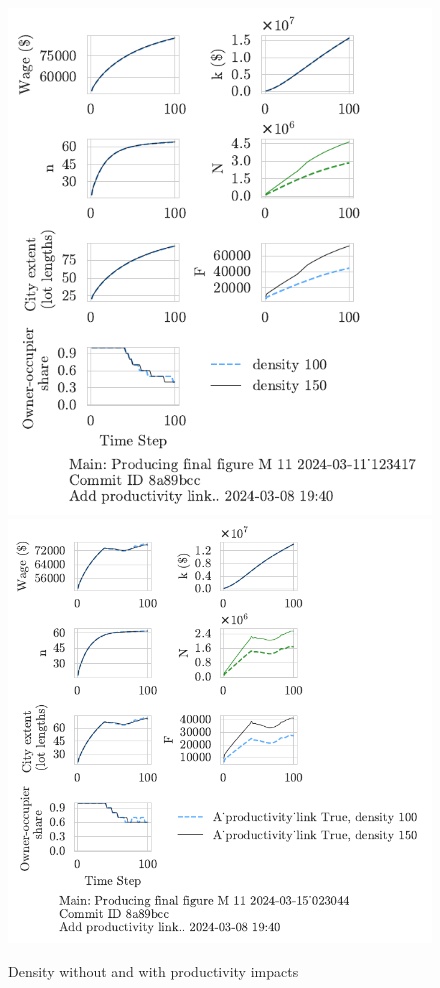 {\begin{figure}[h!tb] 
    \centering
    \includegraphics[scale=.75, trim={0 1.4cm 1.5cm 0},clip]{fig/density-Main-123417.pdf} 
    \includegraphics[scale=.75, trim={0 1.4cm 3.2cm 0},clip]{fig/With-productivity_link-density-023044.pdf} 
    \caption{Density without and with productivity impacts}
    \label{fig:Productivity_link_W-WO-density}
\end{figure}

}
